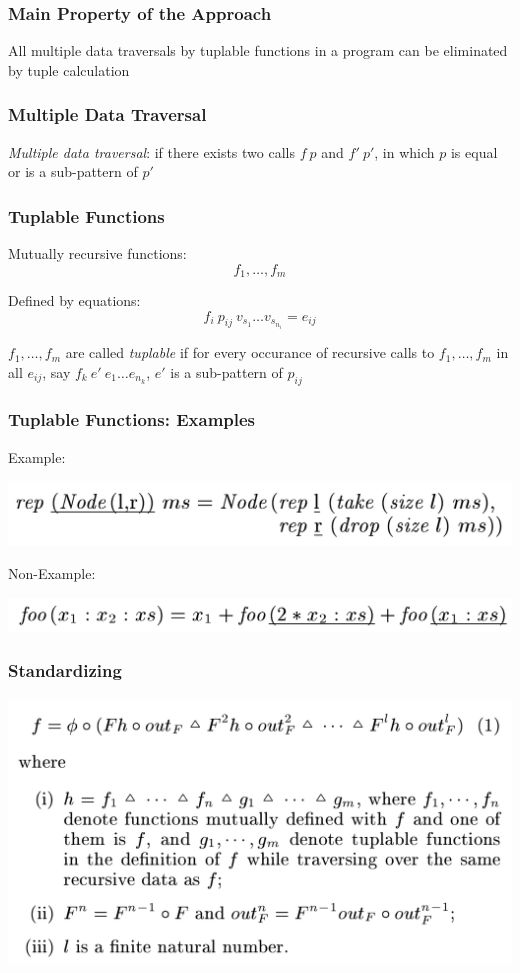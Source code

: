 \documentclass{beamer}
\begin{document}
\begin{frame}[fragile]
  \frametitle{Main Property of the Approach}
\begin{center}
  All multiple data traversals by tuplable functions in a program can be eliminated by tuple calculation
\end{center}
\end{frame}

\begin{frame}[fragile]
  \frametitle{Multiple Data Traversal}
\textit{Multiple data traversal}: if there exists two calls $f \ p$ and $f' \ p'$, in which $p$ is equal or is a sub-pattern of $p'$
\end{frame}

\begin{frame}[fragile]
  \frametitle{Tuplable Functions}
Mutually recursive functions:
$$f_1, \dots, f_m$$

Defined by equations:
$$f_i \ p_{ij} \ v_{s_1} \dots v_{s_{n_i}} = e_{ij}$$

\vspace{0.3cm}

$f_1, \dots, f_m$ are called \textit{tuplable} if for every occurance of recursive calls to $f_1, \dots, f_m$ in all $e_{ij}$, say $f_k \ e' \ e_1 \dots e_{n_k}$, $e'$ is a sub-pattern of $p_{ij}$
\end{frame}

\begin{frame}[fragile]
  \frametitle{Tuplable Functions: Examples}
Example:

\includegraphics[width=\textwidth]{tupExample.png}

\vspace{0.6cm}

Non-Example:

\includegraphics[width=\textwidth]{tupNonExample.png}
\end{frame}

\begin{frame}[fragile]
  \frametitle{Standardizing}
\includegraphics[width=\textwidth]{standard.png}
\end{frame}
\end{document}
